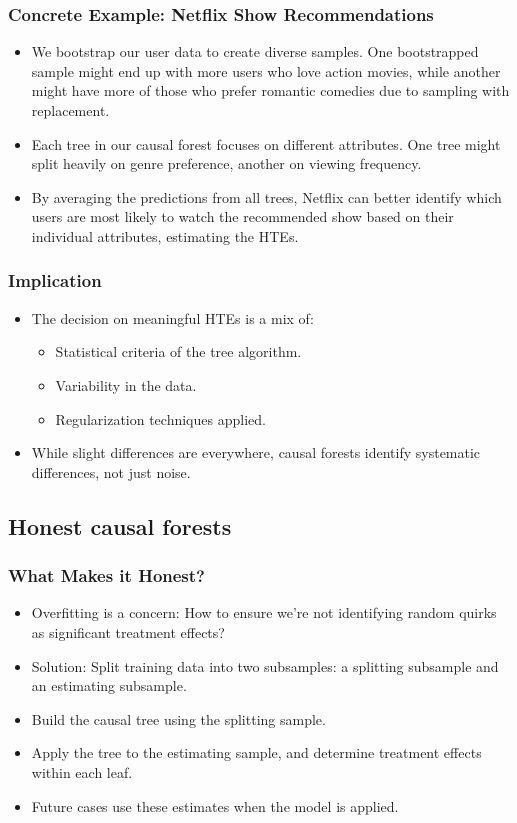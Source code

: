 \documentclass{beamer}
\begin{document}
\begin{frame}
\frametitle{Concrete Example: Netflix Show Recommendations}
\begin{itemize}
\item We bootstrap our user data to create diverse samples. One bootstrapped sample might end up with more users who love action movies, while another might have more of those who prefer romantic comedies due to sampling with replacement.
\item Each tree in our causal forest focuses on different attributes. One tree might split heavily on genre preference, another on viewing frequency.
\item By averaging the predictions from all trees, Netflix can better identify which users are most likely to watch the recommended show based on their individual attributes, estimating the HTEs.
\end{itemize}
\end{frame}


\begin{frame}
\frametitle{Implication}
\begin{itemize}
\item The decision on meaningful HTEs is a mix of:
\begin{itemize}
\item Statistical criteria of the tree algorithm.
\item Variability in the data.
\item Regularization techniques applied.
\end{itemize}
\item While slight differences are everywhere, causal forests identify systematic differences, not just noise.
\end{itemize}
\end{frame}




\subsection{Honest causal forests}



\begin{frame}
\frametitle{What Makes it Honest?}
\begin{itemize}
    \item Overfitting is a concern: How to ensure we're not identifying random quirks as significant treatment effects?
    \item Solution: Split training data into two subsamples: a splitting subsample and an estimating subsample.
    \item Build the causal tree using the splitting sample.
    \item Apply the tree to the estimating sample, and determine treatment effects within each leaf.
    \item Future cases use these estimates when the model is applied.
\end{itemize}
\end{frame}
\end{document}
